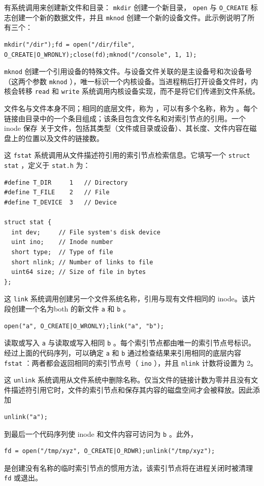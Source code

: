 \documentclass[UTF8]{article}
\begin{document}
有系统调用来创建新文件和目录：
    \lstinline{mkdir}    创建一个新目录，
    \lstinline{open}    与
    \lstinline{O_CREATE}    标志创建一个新的数据文件，并且
    \lstinline{mknod}    创建一个新的设备文件。此示例说明了所有三个：
    \begin{lstlisting}[]mkdir("/dir");fd = open("/dir/file", O_CREATE|O_WRONLY);close(fd);mknod("/console", 1, 1);
\end{lstlisting}   
    \lstinline{mknod}    创建一个引用设备的特殊文件。与设备文件关联的是主设备号和次设备号（这两个参数
    \lstinline{mknod}    ），唯一标识一个内核设备。当进程稍后打开设备文件时，内核会转移
    \lstinline{read}    和
    \lstinline{write}    系统调用内核设备实现，而不是将它们传递到文件系统。  

文件名与文件本身不同；相同的底层文件，称为
        ，可以有多个名称，称为
        。每个链接由目录中的一个条目组成；该条目包含文件名和对索引节点的引用。一个 inode 保存
        关于文件，包括其类型（文件或目录或设备）、其长度、文件内容在磁盘上的位置以及文件的链接数。  

这
    \lstinline{fstat}    系统调用从文件描述符引用的索引节点检索信息。它填写一个
    \lstinline{struct}   
    \lstinline{stat}    ，定义于
    \lstinline{stat.h}           为：
    \begin{lstlisting}[]
#define T_DIR     1   // Directory
#define T_FILE    2   // File
#define T_DEVICE  3   // Device

struct stat {
  int dev;     // File system's disk device
  uint ino;    // Inode number
  short type;  // Type of file
  short nlink; // Number of links to file
  uint64 size; // Size of file in bytes
};
\end{lstlisting}     

这
    \lstinline{link}    系统调用创建另一个文件系统名称，引用与现有文件相同的 inode。该片段创建一个名为both 的新文件
    \lstinline{a}    和
    \lstinline{b}    。
    \begin{lstlisting}[]open("a", O_CREATE|O_WRONLY);link("a", "b");
\end{lstlisting}    读取或写入
    \lstinline{a}    与读取或写入相同
    \lstinline{b}    。每个索引节点都由唯一的索引节点号标识。经过上面的代码序列，可以确定
    \lstinline{a}    和
    \lstinline{b}    通过检查结果来引用相同的底层内容
    \lstinline{fstat}    ：两者都会返回相同的索引节点号（    \lstinline{ino}    ），并且
    \lstinline{nlink}    计数将设置为 2。  

这
    \lstinline{unlink}    系统调用从文件系统中删除名称。仅当文件的链接计数为零并且没有文件描述符引用它时，文件的索引节点和保存其内容的磁盘空间才会被释放。因此添加
    \begin{lstlisting}[]unlink("a");
\end{lstlisting}    到最后一个代码序列使 inode 和文件内容可访问为
    \lstinline{b}    。此外，
    \begin{lstlisting}[]fd = open("/tmp/xyz", O_CREATE|O_RDWR);unlink("/tmp/xyz");
\end{lstlisting}    是创建没有名称的临时索引节点的惯用方法，该索引节点将在进程关闭时被清理
    \lstinline{fd}    或退出。  
\end{document}
